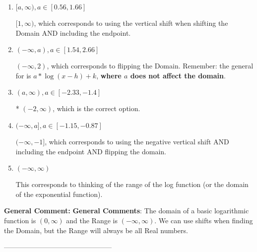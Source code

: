 \documentclass{extbook}[14pt]
\begin{document}
\begin{enumerate}[label=\Alph*.] 
\item $ [a, \infty), a \in [0.56, 1.66] $ 

 $[1, \infty)$, which corresponds to using the vertical shift when shifting the Domain AND including the endpoint. 
\item $ (-\infty, a), a \in [1.54, 2.66] $ 

 $(-\infty, 2)$, which corresponds to flipping the Domain. Remember: the general for is $a*\log(x-h)+k$, \textbf{where $a$ does not affect the domain}. 
\item $ (a, \infty), a \in [-2.33, -1.4] $ 

 * $(-2, \infty)$, which is the correct option. 
\item $ (-\infty, a], a \in [-1.15, -0.87] $ 

 $(-\infty, -1]$, which corresponds to using the negative vertical shift AND including the endpoint AND flipping the domain. 
\item $ (-\infty, \infty) $ 

 This corresponds to thinking of the range of the log function (or the domain of the exponential function). 
\end{enumerate} 
 
\textbf{General Comment:} \textbf{General Comments}: The domain of a basic logarithmic function is $(0, \infty)$ and the Range is $(-\infty, \infty)$. We can use shifts when finding the Domain, but the Range will always be all Real numbers. 

-----------------------------------------------
\end{document}
